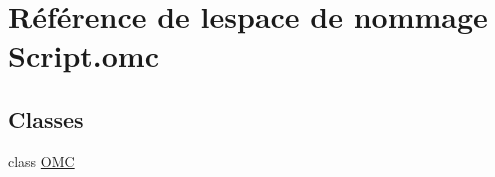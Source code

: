 \hypertarget{namespaceScript_1_1omc}{}\section{Référence de l\textquotesingle{}espace de nommage Script.\+omc}
\label{namespaceScript_1_1omc}
\subsection*{Classes}
\begin{DoxyCompactItemize}
\item 
class \hyperlink{classScript_1_1omc_1_1OMC}{O\+MC}
\end{DoxyCompactItemize}
